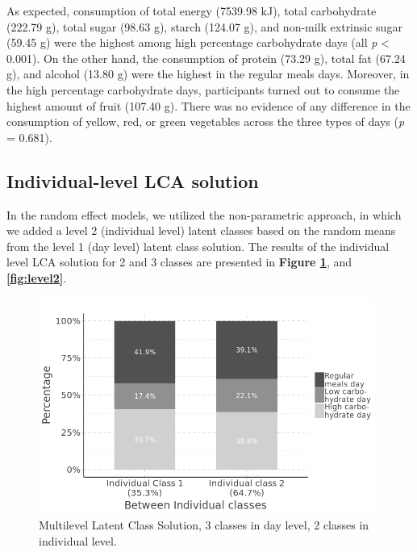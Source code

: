 As expected, consumption of total energy (7539.98 kJ), total carbohydrate (222.79 g), total sugar (98.63 g), starch (124.07 g), and non-milk extrinsic sugar (59.45 g) were the highest among high percentage carbohydrate days (all \textit{p} < 0.001). On the other hand, the consumption of protein (73.29 g), total fat (67.24 g), and alcohol (13.80 g) were the highest in the regular meals days. Moreover, in the high percentage carbohydrate days, participants turned out to consume the highest amount of fruit (107.40 g). There was no evidence of any difference in the consumption of yellow, red, or green vegetables across the three types of days (\textit{p} = 0.681).\vspace{-0.6cm}


\subsection{Individual-level LCA solution}\vspace{-0.3cm}

In the random effect models, we utilized the non-parametric approach, in which we added a level 2 (individual level) latent classes based on the random means from the level 1 (day level) latent class solution. The results of the individual level LCA solution for 2 and 3 classes are presented in \textbf{Figure \ref{fig:CB2level2}}, and \textbf{\ref{fig:level2}}. 


\begin{figure}[H]
	\centering
	\includegraphics[width=11cm]{Figures/CB2level2.png}
	\decoRule
	\caption[Multilevel Latent Class Solution ($3\times2$).]{Multilevel Latent Class Solution, 3 classes in day level, 2 classes in individual level.}
	\label{fig:CB2level2}
\end{figure}

